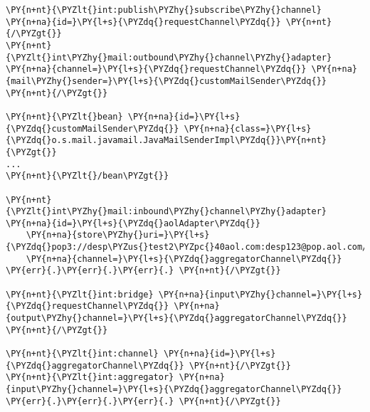 \begin{Verbatim}[commandchars=\\\{\}]
\PY{n+nt}{\PYZlt{}int:publish\PYZhy{}subscribe\PYZhy{}channel} \PY{n+na}{id=}\PY{l+s}{\PYZdq{}requestChannel\PYZdq{}} \PY{n+nt}{/\PYZgt{}}
\PY{n+nt}{\PYZlt{}int\PYZhy{}mail:outbound\PYZhy{}channel\PYZhy{}adapter} \PY{n+na}{channel=}\PY{l+s}{\PYZdq{}requestChannel\PYZdq{}} \PY{n+na}{mail\PYZhy{}sender=}\PY{l+s}{\PYZdq{}customMailSender\PYZdq{}} \PY{n+nt}{/\PYZgt{}}

\PY{n+nt}{\PYZlt{}bean} \PY{n+na}{id=}\PY{l+s}{\PYZdq{}customMailSender\PYZdq{}} \PY{n+na}{class=}\PY{l+s}{\PYZdq{}o.s.mail.javamail.JavaMailSenderImpl\PYZdq{}}\PY{n+nt}{\PYZgt{}}
...
\PY{n+nt}{\PYZlt{}/bean\PYZgt{}} 

\PY{n+nt}{\PYZlt{}int\PYZhy{}mail:inbound\PYZhy{}channel\PYZhy{}adapter} \PY{n+na}{id=}\PY{l+s}{\PYZdq{}aolAdapter\PYZdq{}}
    \PY{n+na}{store\PYZhy{}uri=}\PY{l+s}{\PYZdq{}pop3://desp\PYZus{}test2\PYZpc{}40aol.com:desp123@pop.aol.com/INBOX\PYZdq{}}
    \PY{n+na}{channel=}\PY{l+s}{\PYZdq{}aggregatorChannel\PYZdq{}} \PY{err}{.}\PY{err}{.}\PY{err}{.} \PY{n+nt}{/\PYZgt{}}

\PY{n+nt}{\PYZlt{}int:bridge} \PY{n+na}{input\PYZhy{}channel=}\PY{l+s}{\PYZdq{}requestChannel\PYZdq{}} \PY{n+na}{output\PYZhy{}channel=}\PY{l+s}{\PYZdq{}aggregatorChannel\PYZdq{}} \PY{n+nt}{/\PYZgt{}}

\PY{n+nt}{\PYZlt{}int:channel} \PY{n+na}{id=}\PY{l+s}{\PYZdq{}aggregatorChannel\PYZdq{}} \PY{n+nt}{/\PYZgt{}}
\PY{n+nt}{\PYZlt{}int:aggregator} \PY{n+na}{input\PYZhy{}channel=}\PY{l+s}{\PYZdq{}aggregatorChannel\PYZdq{}} \PY{err}{.}\PY{err}{.}\PY{err}{.} \PY{n+nt}{/\PYZgt{}}
\end{Verbatim}
